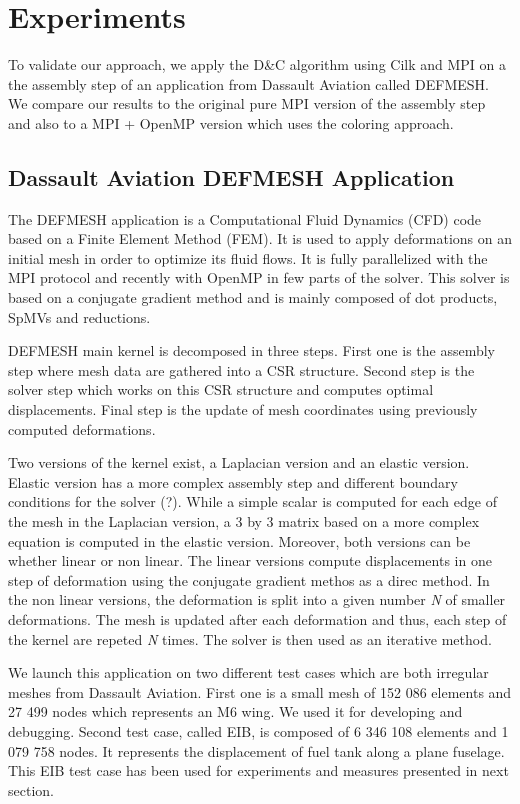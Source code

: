 \documentclass{IOS-Book-Article}
\begin{document}
\section{Experiments}
To validate our approach, we apply the D\&C algorithm using Cilk and MPI on a the assembly step of an application from Dassault Aviation called DEFMESH.
We compare our results to the original pure MPI version of the assembly step and also to a MPI + OpenMP version which uses the coloring approach.

\subsection{Dassault Aviation DEFMESH Application}
The DEFMESH application is a Computational Fluid Dynamics (CFD) code based on a Finite Element Method (FEM).
It is used to apply deformations on an initial mesh in order to optimize its fluid flows.
It is fully parallelized with the MPI protocol and recently with OpenMP in few parts of the solver.
This solver is based on a conjugate gradient method and is mainly composed of dot products, SpMVs and reductions.

DEFMESH main kernel is decomposed in three steps.
First one is the assembly step where mesh data are gathered into a CSR structure.
Second step is the solver step which works on this CSR structure and computes optimal displacements.
Final step is the update of mesh coordinates using previously computed deformations.

Two versions of the kernel exist, a Laplacian version and an elastic version. Elastic version has a more complex assembly step and different boundary conditions for the solver (?).
While a simple scalar is computed for each edge of the mesh in the Laplacian version, a 3 by 3 matrix based on a more complex equation is computed in the elastic version.
Moreover, both versions can be whether linear or non linear.
The linear versions compute displacements in one step of deformation using the conjugate gradient methos as a direc method.
In the non linear versions, the deformation is split into a given number \emph{N} of smaller deformations.
The mesh is updated after each deformation and thus, each step of the kernel are repeted \emph{N} times. The solver is then used as an iterative method.

We launch this application on two different test cases which are both irregular meshes from Dassault Aviation.
First one is a small mesh of 152 086 elements and 27 499 nodes which represents an M6 wing. We used it for developing and debugging.
Second test case, called EIB, is composed of 6 346 108 elements and 1 079 758 nodes. It represents the displacement of fuel tank along a plane fuselage.
This EIB test case has been used for experiments and measures presented in next section.
\end{document}
